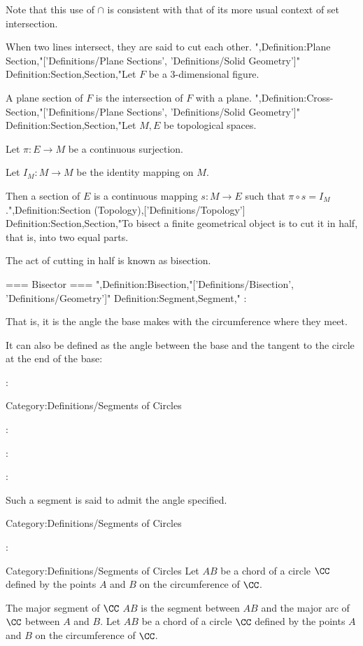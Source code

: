 Note that this use of $\cap$ is consistent with that of its more usual context of set intersection.


When two lines intersect, they are said to cut each other.
",Definition:Plane Section,"['Definitions/Plane Sections', 'Definitions/Solid Geometry']"
Definition:Section,Section,"Let $F$ be a $3$-dimensional figure.

A plane section of $F$ is the intersection of $F$ with a plane.
",Definition:Cross-Section,"['Definitions/Plane Sections', 'Definitions/Solid Geometry']"
Definition:Section,Section,"Let $M, E$ be topological spaces. 

Let $\pi: E \to M$ be a continuous surjection. 

Let $I_M: M \to M$ be the identity mapping on $M$. 


Then a section of $E$ is a continuous mapping $s: M \to E$ such that $\pi \circ s = I_M$.",Definition:Section (Topology),['Definitions/Topology']
Definition:Section,Section,"To bisect a finite geometrical object is to cut it in half, that is, into two equal parts.

The act of cutting in half is known as bisection.


=== Bisector ===
",Definition:Bisection,"['Definitions/Bisection', 'Definitions/Geometry']"
Definition:Segment,Segment,"
:

That is, it is the angle the base makes with the circumference where they meet.


It can also be defined as the angle between the base and the tangent to the circle at the end of the base:

:


Category:Definitions/Segments of Circles

:

:


:

Such a segment is said to admit the angle specified.


Category:Definitions/Segments of Circles

:



Category:Definitions/Segments of Circles
Let $AB$ be a chord of a circle $\CC$ defined by the points $A$ and $B$ on the circumference of $\CC$.

The major segment of $\CC$  $AB$ is the segment between $AB$ and the major arc of $\CC$ between $A$ and $B$.
Let $AB$ be a chord of a circle $\CC$ defined by the points $A$ and $B$ on the circumference of $\CC$.

